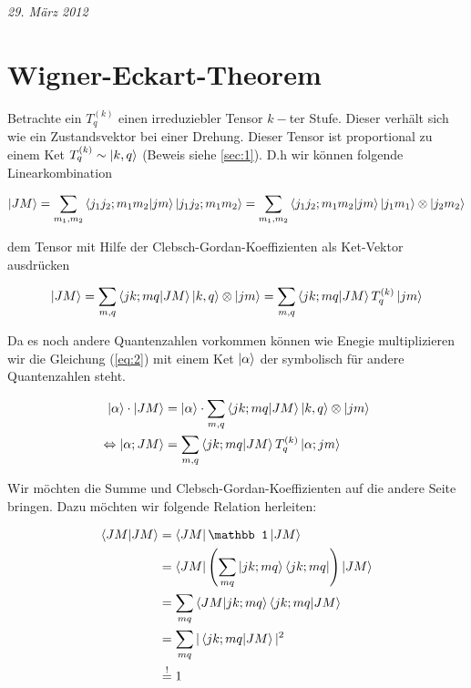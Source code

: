 
\usepackage{amsmath} 





\textit{29. März 2012}


\section*{Wigner-Eckart-Theorem}


Betrachte ein \(T^{(k)}_q\) einen irreduziebler Tensor \(k-\)ter Stufe. Dieser verhält sich wie ein Zustandsvektor bei einer Drehung. Dieser Tensor ist proportional zu einem Ket \(T^{(k)}_q \sim \left| k,q \right\rangle \) (Beweis siehe \ref{sec:1}). D.h wir können folgende Linearkombination

\begin{equation}
  \label{eq:1}
  \ket{JM} = \sum_{m_1,m_2}\braket{j_1j_2;m_1m_2}{jm}\ket{j_1j_2;m_1m_2} = \sum_{m_1,m_2}\braket{j_1j_2;m_1m_2}{jm}\ket{j_1m_1} \otimes \ket{j_2m_2}
\end{equation}

dem Tensor  mit Hilfe der Clebsch-Gordan-Koeffizienten als Ket-Vektor ausdrücken

\begin{equation}
  \label{eq:2}
  \ket{JM} = \sum_{m,q} \braket{jk;mq}{JM} \ket{k,q}\otimes\ket{jm} =  \sum_{m,q} \braket{jk;mq}{JM} T^{(k)}_q  \ket{jm} 
\end{equation}


Da es noch andere Quantenzahlen vorkommen können wie Enegie multiplizieren wir die Gleichung (\ref{eq:2}) mit einem Ket \(\left| \alpha \right\rangle\) der symbolisch für andere Quantenzahlen steht.

\begin{align}
  \label{eq:3}
  \ket{\alpha}\cdot\ket{JM} &=  \ket{\alpha}\cdot\sum_{m,q} \braket{jk;mq}{JM} \ket{k,q}\otimes\ket{jm}\notag \\
\Leftrightarrow \ket{\alpha; JM} &=  \sum_{m,q} \braket{jk;mq}{JM} T^{(k)}_q  \ket{\alpha;jm} 
\end{align}

Wir möchten die Summe und  Clebsch-Gordan-Koeffizienten auf die andere Seite bringen. Dazu möchten wir folgende Relation herleiten:

\begin{align*}
  \label{eq:4}
 \braket{JM}{JM} &= \bra{JM} \mathbb 1 \ket{JM} \\
&= \bra{JM} \left( \sum_{mq}\ket{jk;mq}\bra{jk;mq}  \right) \ket{JM} \\
&=  \sum_{mq}\braket{JM}{jk;mq}\braket{jk;mq}{JM} \\
&=  \sum_{mq}|\braket{jk;mq}{JM} |^2\\
&\stackrel{!}= 1
\end{align*}

